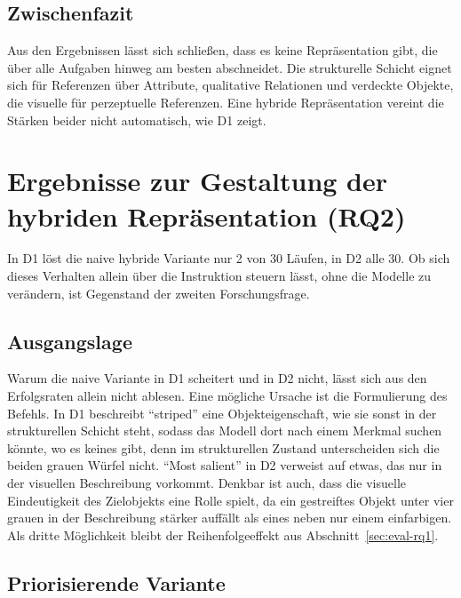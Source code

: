 \subsection*{Zwischenfazit}

Aus den Ergebnissen lässt sich schließen, dass es keine Repräsentation gibt, die über alle Aufgaben hinweg am besten abschneidet.
Die strukturelle Schicht eignet sich für Referenzen über Attribute, qualitative Relationen und verdeckte Objekte, die visuelle für perzeptuelle Referenzen.
Eine hybride Repräsentation vereint die Stärken beider nicht automatisch, wie D1 zeigt.


\section[Ergebnisse zu RQ2]{Ergebnisse zur Gestaltung der hybriden Repräsentation (RQ2)}
\label{sec:eval-rq2}

In D1 löst die naive hybride Variante nur 2 von 30 Läufen, in D2 alle 30.
Ob sich dieses Verhalten allein über die Instruktion steuern lässt, ohne die Modelle zu verändern, ist Gegenstand der zweiten Forschungsfrage.

\subsection*{Ausgangslage}

Warum die naive Variante in D1 scheitert und in D2 nicht, lässt sich aus den Erfolgsraten allein nicht ablesen.
Eine mögliche Ursache ist die Formulierung des Befehls.
In D1 beschreibt \enquote{striped} eine Objekteigenschaft, wie sie sonst in der strukturellen Schicht steht, sodass das Modell dort nach einem Merkmal suchen könnte, wo es keines gibt, denn im strukturellen Zustand unterscheiden sich die beiden grauen Würfel nicht.
\enquote{Most salient} in D2 verweist auf etwas, das nur in der visuellen Beschreibung vorkommt.
Denkbar ist auch, dass die visuelle Eindeutigkeit des Zielobjekts eine Rolle spielt, da ein gestreiftes Objekt unter vier grauen in der Beschreibung stärker auffällt als eines neben nur einem einfarbigen.
Als dritte Möglichkeit bleibt der Reihenfolgeeffekt aus Abschnitt~\ref{sec:eval-rq1}.

\subsection*{Priorisierende Variante}

